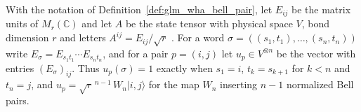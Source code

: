 \begin{definition}
    \label{def:glm_wha_bell_pair_state}
    \leanok
    With the notation of Definition~\ref{def:glm_wha_bell_pair}, let $E_{ij}$
    be the matrix units of $M_r(\mathbb C)$ and let $A$ be the state tensor
    with physical space $V$, bond dimension $r$ and letters
    $A^{ij}=E_{ij}/\sqrt r$ \cite{gap:glm23_wha_parent_completion}. For a word
    $\sigma=((s_1,t_1),\dots,(s_n,t_n))$ write
    $E_\sigma=E_{s_1t_1}\cdots E_{s_nt_n}$, and for a pair $p=(i,j)$ let
    $u_p\in V^{\otimes n}$ be the vector with entries $(E_\sigma)_{ij}$. Thus
    $u_p(\sigma)=1$ exactly when $s_1=i$, $t_k=s_{k+1}$ for $k<n$ and $t_n=j$,
    and $u_p=\sqrt r^{\,n-1}\,W_n|i,j\rangle$ for the map $W_n$ inserting $n-1$
    normalized Bell pairs.
\end{definition}

